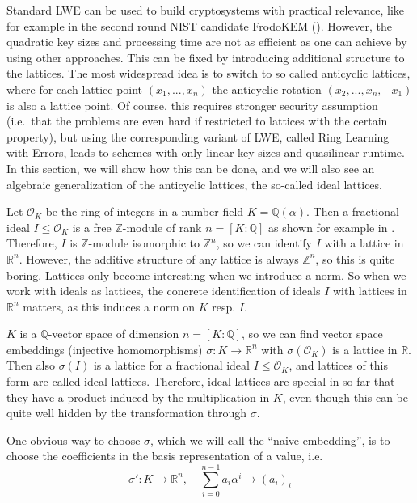 \documentclass{report}
\newcommand{\Z}{\mathbb{Z}}
\newcommand{\R}{\mathbb{R}}
\begin{document}
\motivation
Standard LWE can be used to build cryptosystems with practical relevance, like for example in the second round NIST candidate FrodoKEM (\cite{FrodoKEM}). However, the quadratic key sizes and processing time are not as efficient as one can achieve by using other approaches. This can be fixed by introducing additional structure to the lattices. The most widespread idea is to switch to so called anticyclic lattices, where for each lattice point $(x_1, ..., x_n)$ the anticyclic rotation $(x_2, ..., x_n, -x_1)$ is also a lattice point. Of course, this requires stronger security assumption (i.e.\ that the problems are even hard if restricted to lattices with the certain property), but using the corresponding variant of LWE, called Ring Learning with Errors, leads to schemes with only linear key sizes and quasilinear runtime. In this section, we will show how this can be done, and we will also see an algebraic generalization of the anticyclic lattices, the so-called ideal lattices.

Let $\mathcal{O}_K$ be the ring of integers in a number field $K = \mathbb{Q}(\alpha)$. Then a fractional ideal $I \leq \mathcal{O}_K$ is a free $\Z$-module of rank $n = [K : \mathbb{Q}]$ as shown for example in \cite[2.10]{Neukirch}. Therefore, $I$ is $\Z$-module isomorphic to $\Z^n$, so we can identify $I$ with a lattice in $\R^n$. However, the additive structure of any lattice is always $\Z^n$, so this is quite boring. Lattices only become interesting when we introduce a norm. So when we work with ideals as lattices, the concrete identification of ideals $I$ with lattices in $\R^n$ matters, as this induces a norm on $K$ resp. $I$.

$K$ is a $\mathbb{Q}$-vector space of dimension $n = [K : \mathbb{Q}]$, so we can find vector space embeddings (injective homomorphisms) $\sigma: K \to \R^n$ with $\sigma(\mathcal{O}_K)$ is a lattice in $\R$. Then also $\sigma(I)$ is a lattice for a fractional ideal $I \leq \mathcal{O}_K$, and lattices of this form are called ideal lattices. Therefore, ideal lattices are special in so far that they have a product induced by the multiplication in $K$, even though this can be quite well hidden by the transformation through $\sigma$.

One obvious way to choose $\sigma$, which we will call the ``naive embedding'', is to choose the coefficients in the basis representation of a value, i.e.
\begin{equation}
\sigma': K \to \R^n, \quad \sum_{i = 0}^{n - 1} a_i \alpha^i \mapsto (a_i)_i \nonumber
\end{equation}
\end{document}
